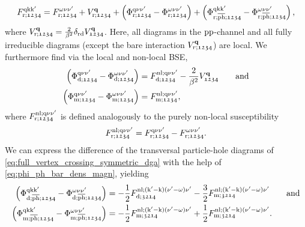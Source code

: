 \documentclass[../../main.tex]{subfiles}
\begin{document}
\begin{align}\label{eq:full_vertex_crossing_symmetric_dga}
	F^{\text{q}\text{k}\text{k}'}_{\text{r};\mathfrak{1234}}=F^{\omega\nu\nu'}_{\text{r};\mathfrak{1234}}+V_{\text{r};\mathfrak{1234}}^{\textbf{q}}+\left (\Phi^{\text{q}\nu\nu'}_{\text{r};\mathfrak{1234}}-\Phi^{\omega\nu\nu'}_{\text{r};\mathfrak{1234}}\right )+\left (\Phi^{\text{q}\text{k}\text{k}'}_{\text{r};\overline{\text{ph}};\mathfrak{1234}}-\Phi^{\omega\nu\nu'}_{\text{r};\overline{\text{ph}};\mathfrak{1234}}\right ),
\end{align}
where $V_{\text{r};\mathfrak{1234}}^{\textbf{q}}=\frac{2}{\beta^2}\delta_{\text{r}\text{d}}V_{\mathfrak{1234}}^{\textbf{q}}$. Here, all diagrams in the $\text{pp}$-channel and all fully irreducible diagrams (except the bare interaction $V^{\textbf{q}}_{r;\mathfrak{1234}}$) are local. We furthermore find via the local and non-local BSE,
\begin{subequations}
\begin{align}
	\left (\Phi^{\text{q}\nu\nu'}_{\text{d};\mathfrak{1234}}-\Phi^{\omega\nu\nu'}_{\text{d};\mathfrak{1234}}\right )&=F_{\text{d};\mathfrak{1234}}^{\text{nl};\text{q}\nu\nu'}-\frac{2}{\beta^2}V^{\textbf{q}}_{\mathfrak{1234}}\qquad\text{and}\\
	\left (\Phi^{\text{q}\nu\nu'}_{\text{m};\mathfrak{1234}}-\Phi^{\omega\nu\nu'}_{\text{m};\mathfrak{1234}}\right )&=F_{\text{m};\mathfrak{1234}}^{\text{nl};\text{q}\nu\nu'},
\end{align}
\end{subequations}
where $F_{\text{r};\mathfrak{1234}}^{\text{nl};\text{q}\nu\nu'}$ is defined analogously to the purely non-local susceptibility 
\begin{align}
	F_{\text{r};\mathfrak{1234}}^{\text{nl};\text{q}\nu\nu'}=F_{\text{r};\mathfrak{1234}}^{\text{q}\nu\nu'}-F_{\text{r};\mathfrak{1234}}^{\omega\nu\nu'}.
\end{align}
We can express the difference of the transversal particle-hole diagrams of \eqref{eq:full_vertex_crossing_symmetric_dga} with the help of  \eqref{eq:phi_ph_bar_dens_magn}, yielding
\begin{subequations}
\begin{align}
	\left (\Phi^{\text{q}\text{k}\text{k}'}_{\text{d};\overline{\text{ph}};\mathfrak{1234}}-\Phi^{\omega\nu\nu'}_{\text{d};\overline{\text{ph}};\mathfrak{1234}}\right )&=-\frac12 F_{\text{d};\mathfrak{3214}}^{\text{nl};(\text{k}'-\text{k})(\nu'-\omega)\nu'}-\frac32 F_{\text{m};\mathfrak{3214}}^{\text{nl};(\text{k}'-\text{k})(\nu'-\omega)\nu'}\qquad\text{and}\\
	\left (\Phi^{\text{q}\text{k}\text{k}'}_{\text{m};\overline{\text{ph}};\mathfrak{1234}}-\Phi^{\omega\nu\nu'}_{\text{m};\overline{\text{ph}};\mathfrak{1234}}\right )&=-\frac12 F_{\text{m};\mathfrak{3214}}^{\text{nl};(\text{k}'-\text{k})(\nu'-\omega)\nu'}+\frac12 F_{\text{m};\mathfrak{3214}}^{\text{nl};(\text{k}'-\text{k})(\nu'-\omega)\nu'}.
\end{align}
\end{subequations}
\end{document}
